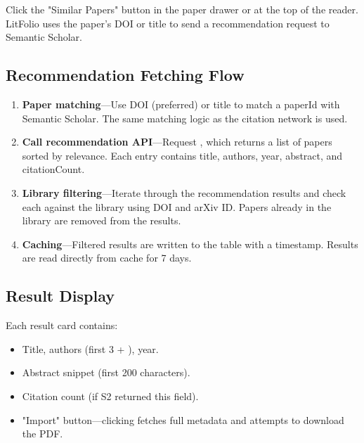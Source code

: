 Click the "Similar Papers" button in the paper drawer or at the top of the reader. LitFolio uses
the paper's DOI or title to send a recommendation request to Semantic Scholar.


\subsection{Recommendation Fetching Flow}

\begin{enumerate}
  \item \textbf{Paper matching}---Use DOI (preferred) or title to match a paperId with Semantic
    Scholar. The same matching logic as the citation network is used.
  \item \textbf{Call recommendation API}---Request
    , which returns a list of papers sorted by relevance.
    Each entry contains title, authors, year, abstract, and citationCount.
  \item \textbf{Library filtering}---Iterate through the recommendation results and check each
    against the library using DOI and arXiv ID. Papers already in the library are removed from the
    results.
  \item \textbf{Caching}---Filtered results are written to the  table
    with a  timestamp. Results are read directly from cache for 7 days.
\end{enumerate}

\subsection{Result Display}

Each result card contains:

\begin{itemize}
  \item Title, authors (first 3 + ), year.
  \item Abstract snippet (first 200 characters).
  \item Citation count (if S2 returned this field).
  \item "Import" button---clicking fetches full metadata and attempts to download the PDF.
\end{itemize}

